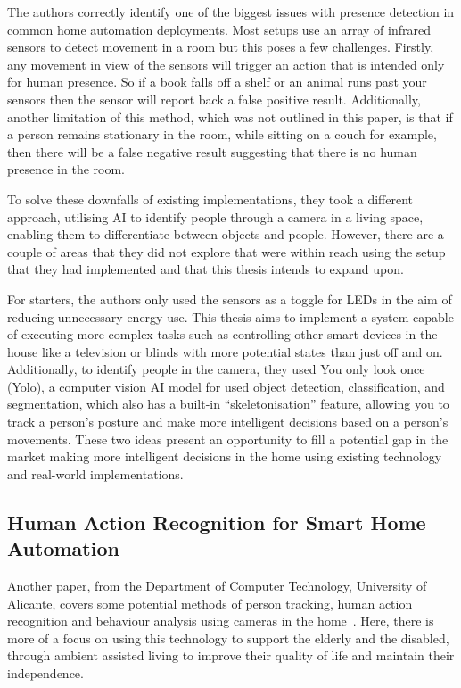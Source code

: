 The authors correctly identify one of the biggest issues with presence detection in common home automation deployments.
Most setups use an array of infrared sensors to detect movement in a room but this poses a few challenges.
Firstly, any movement in view of the sensors will trigger an action that is intended only for human presence.
So if a book falls off a shelf or an animal runs past your sensors then the sensor will report back a false positive result.
Additionally, another limitation of this method, which was not outlined in this paper, is that if a person remains stationary in the room, while sitting on a couch for example, then there will be a false negative result suggesting that there is no human presence in the room.

To solve these downfalls of existing implementations, they took a different approach, utilising AI to identify people through a camera in a living space, enabling them to differentiate between objects and people.
However, there are a couple of areas that they did not explore that were within reach using the setup that they had implemented and that this thesis intends to expand upon.

For starters, the authors only used the sensors as a toggle for LEDs in the aim of reducing unnecessary energy use.
This thesis aims to implement a system capable of executing more complex tasks such as controlling other smart devices in the house like a television or blinds with more potential states than just off and on.
Additionally, to identify people in the camera, they used You only look once (Yolo), a computer vision AI model for used object detection, classification, and segmentation, which also has a built-in ``skeletonisation'' feature, allowing you to track a person's posture and make more intelligent decisions based on a person's movements.
These two ideas present an opportunity to fill a potential gap in the market making more intelligent decisions in the home using existing technology and real-world implementations.

\subsection{Human Action Recognition for Smart Home Automation}
Another paper, from the Department of Computer Technology, University of Alicante, covers some potential methods of person tracking, human action recognition and behaviour analysis using cameras in the home~\cite{Chaa13}.
Here, there is more of a focus on using this technology to support the elderly and the disabled, through ambient assisted living to improve their quality of life and maintain their independence.

